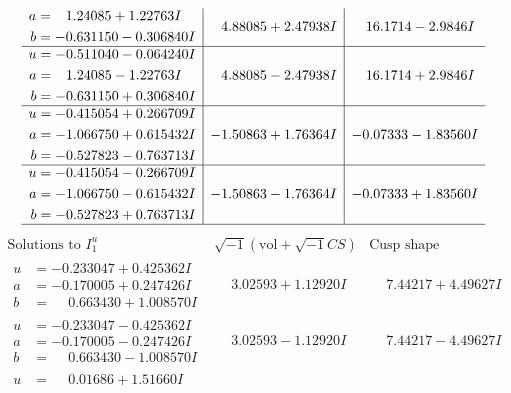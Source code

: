 \documentclass[1p]{elsarticle_modified}
\theoremstyle{definition}
\newcommand{\I}{\sqrt{-1}}
\begin{document}
$$\begin{array}{c|c|c}
\begin{aligned}
a &= \phantom{-}1.24085 + 1.22763 I \\
b &= -0.631150 - 0.306840 I\end{aligned}
 & \phantom{-}4.88085 + 2.47938 I & \phantom{-}16.1714 - 2.9846 I \\ \hline\begin{aligned}
u &= -0.511040 - 0.064240 I \\
a &= \phantom{-}1.24085 - 1.22763 I \\
b &= -0.631150 + 0.306840 I\end{aligned}
 & \phantom{-}4.88085 - 2.47938 I & \phantom{-}16.1714 + 2.9846 I \\ \hline\begin{aligned}
u &= -0.415054 + 0.266709 I \\
a &= -1.066750 + 0.615432 I \\
b &= -0.527823 - 0.763713 I\end{aligned}
 & -1.50863 + 1.76364 I & -0.07333 - 1.83560 I \\ \hline\begin{aligned}
u &= -0.415054 - 0.266709 I \\
a &= -1.066750 - 0.615432 I \\
b &= -0.527823 + 0.763713 I\end{aligned}
 & -1.50863 - 1.76364 I & -0.07333 + 1.83560 I\\
 \hline 
 \end{array}$$\newpage$$\begin{array}{c|c|c}  
\text{Solutions to }I^u_{1}& \I (\text{vol} + \sqrt{-1}CS) & \text{Cusp shape}\\
 \hline 
\begin{aligned}
u &= -0.233047 + 0.425362 I \\
a &= -0.170005 + 0.247426 I \\
b &= \phantom{-}0.663430 + 1.008570 I\end{aligned}
 & \phantom{-}3.02593 + 1.12920 I & \phantom{-}7.44217 + 4.49627 I \\ \hline\begin{aligned}
u &= -0.233047 - 0.425362 I \\
a &= -0.170005 - 0.247426 I \\
b &= \phantom{-}0.663430 - 1.008570 I\end{aligned}
 & \phantom{-}3.02593 - 1.12920 I & \phantom{-}7.44217 - 4.49627 I \\ \hline\begin{aligned}
u &= \phantom{-}0.01686 + 1.51660 I \\

\end{aligned}
\end{array}$$
\end{document}
